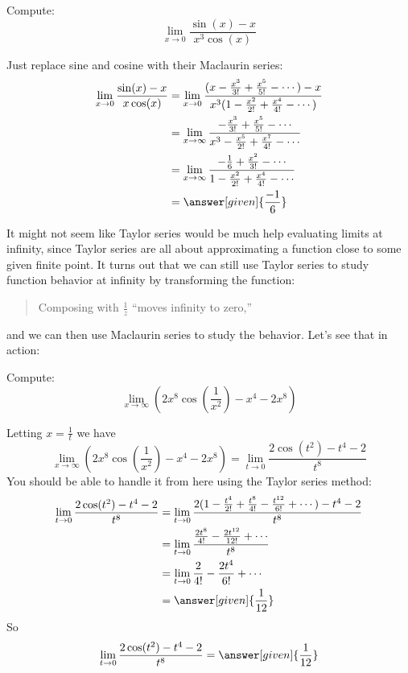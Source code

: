 \documentclass{ximera}
\begin{document}
\begin{example}
  Compute:
  \[
  \lim_{x \to 0} \frac{\sin(x)-x}{x^3\cos(x)} 
  \]
  \begin{explanation}
    Just replace sine and cosine with their Maclaurin series:
    \begin{align*}
      \lim_{x \to 0} \frac{\sin(x)-x}{x\cos(x)} &= \lim_{x \to 0} \frac{(x-\frac{x^3}{3!}+\frac{x^5}{5!}-\cdots)-x}{x^3(1-\frac{x^2}{2!}+\frac{x^4}{4!}-\cdots)}\\
      &= \lim_{x \to \infty} \frac{-\frac{x^3}{3!}+\frac{x^5}{5!}-\cdots}{x^3 - \frac{x^5}{2!}+\frac{x^7}{4!}-\cdots}\\
      &=\lim_{x \to \infty} \frac{-\frac{1}{6}+\frac{x^2}{3!}-\cdots}{1-\frac{x^2}{2!}+\frac{x^4}{4!}-\cdots}\\
      &=\answer[given]{\frac{-1}{6}}
    \end{align*}
  \end{explanation}
\end{example}

It might not seem like Taylor series would be much help evaluating
limits at infinity, since Taylor series are all about approximating a
function close to some given finite point.  It turns out that we can
still use Taylor series to study function behavior at infinity by
transforming the function:
\begin{quote}
  Composing with $\frac{1}{z}$ ``moves infinity to zero,''
\end{quote}
and we can then use Maclaurin series to study the behavior.  Let's see
that in action:

\begin{example}
  Compute:	
  \[
  \lim_{x \to \infty} \left(2x^8\cos\left(\frac{1}{x^2}\right) - x^4-2x^8\right)
  \]
  \begin{explanation}
    Letting $x=\frac{1}{t}$ we have
	\[
	\lim_{x \to \infty} \left(2x^8\cos\left(\frac{1}{x^2}\right) - x^4-2x^8\right)=\lim_{t \to 0} \frac{2\cos\left(t^2\right) - t^4-2}{t^8}
	\]
	You should be able to handle it from here using the Taylor
        series method:
	\begin{align*}
	  \lim_{t \to 0} \frac{2\cos(t^2) - t^4-2}{t^8} &= \lim_{t \to 0} \frac{2(1-\frac{t^4}{2!}+\frac{t^8}{4!}-\frac{t^{12}}{6!}+\cdots) - t^4-2}{t^8}\\
	  &=  \lim_{t \to 0} \frac{\frac{2t^8}{4!}-\frac{2t^{12}}{12!}+\cdots}{t^8}\\
	  &=\lim_{t \to 0} \frac{2}{4!}-\frac{2t^4}{6!} +\cdots\\
	  &=\answer[given]{\frac{1}{12}}
        \end{align*}
        So
	\[
	\lim_{t \to 0} \frac{2\cos(t^2) - t^4-2}{t^8} = \answer[given]{\frac{1}{12}}
	\]
  \end{explanation}	
\end{example}
\end{document}
